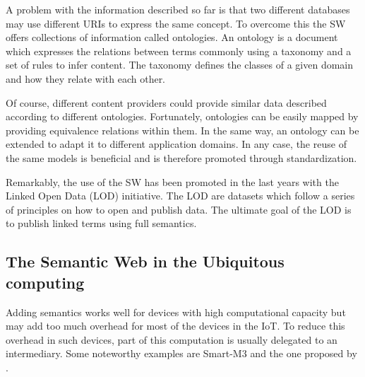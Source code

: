 

A problem with the information described so far is that two different databases may use different URIs to express the same concept.
To overcome this the SW offers collections of information called ontologies.
An ontology is a document which expresses the relations between terms commonly using a taxonomy and a set of rules to infer content.
The taxonomy defines the classes of a given domain and how they relate with each other.

Of course, different content providers could provide similar data described according to different ontologies.
Fortunately, ontologies can be easily mapped by providing equivalence relations within them.
In the same way, an ontology can be extended to adapt it to different application domains.
In any case, the reuse of the same models is beneficial and is therefore promoted through standardization.

Remarkably, the use of the SW has been promoted in the last years with the Linked Open Data (LOD) initiative.
The LOD are datasets which follow a series of principles on how to open and publish data.
The ultimate goal of the LOD is to publish linked terms using full semantics.




\subsection{The Semantic Web in the Ubiquitous computing}




Adding semantics works well for devices with high computational capacity but may add too much overhead for most of the devices in the IoT.
To reduce this overhead in such devices, part of this computation is usually delegated to an intermediary.
Some noteworthy examples are Smart-M3 \citep{honkola_smart-m3_2010} and the one proposed by \citet{broring_semantic_2009}.

